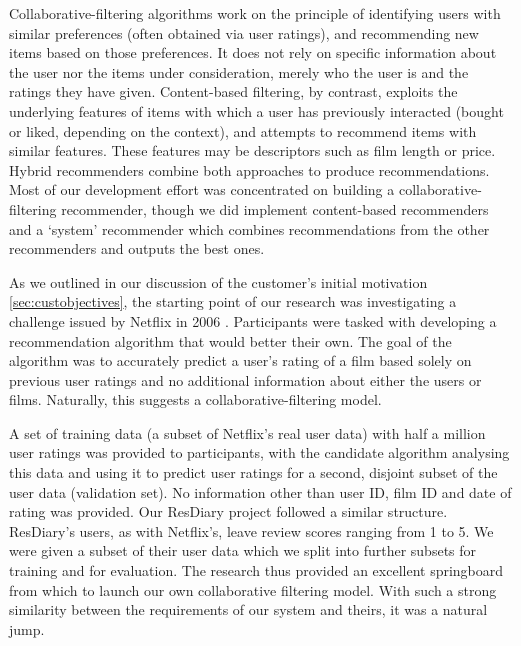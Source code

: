 \documentclass{l3proj}
\begin{document}
Collaborative-filtering algorithms work on the principle of identifying users with similar preferences (often obtained via user ratings), and recommending new items based on those preferences. It does not rely on specific information about the user nor the items under consideration, merely who the user is and the ratings they have given. Content-based filtering, by contrast, exploits the underlying features of items with which a user has previously interacted (bought or liked, depending on the context), and attempts to recommend items with similar features. These features may be descriptors such as film length or price. Hybrid recommenders combine both approaches to produce recommendations. Most of our development effort was concentrated on building a collaborative-filtering recommender, though we did implement content-based recommenders and a `system' recommender which combines recommendations from the other recommenders and outputs the best ones. 

As we outlined in our discussion of the customer’s initial motivation \ref{sec:custobjectives}, the starting point of our research was investigating a challenge issued by Netflix in 2006 \cite{NetflixPrize}. Participants were tasked with developing a recommendation algorithm that would better their own. The goal of the algorithm was to accurately predict a user's rating of a film based solely on previous user ratings and no additional information about either the users or films. Naturally, this suggests a collaborative-filtering model.

A set of training data (a subset of Netflix's real user data) with half a million user ratings was provided to participants, with the candidate algorithm analysing this data and using it to predict user ratings for a second, disjoint subset of the user data (validation set). No information other than user ID, film ID and date of rating was provided. Our ResDiary project followed a similar structure. ResDiary's users, as with Netflix's, leave review scores ranging from 1 to 5. We were given a subset of their user data which we split into further subsets for training and for evaluation. The research thus provided an excellent springboard from which to launch our own collaborative filtering model. With such a strong similarity between the requirements of our system and theirs, it was a natural jump.
\end{document}
